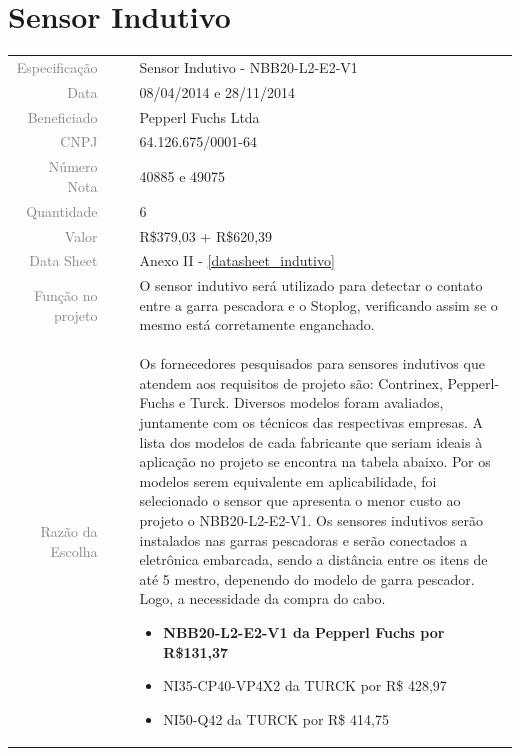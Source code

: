 

\section{Sensor Indutivo}
\label{indutivo}


\begin{table}[ht!]

	\begin{tabular}{r l|l p{12cm} }
		
		\textcolor{gray}{Especificação} &&& 	{Sensor Indutivo - NBB20-L2-E2-V1 }\\
		\textcolor{gray}{Data} &&& 				{08/04/2014 e 28/11/2014}\\
        \textcolor{gray}{Beneficiado} &&&		{Pepperl Fuchs Ltda} \\
        \textcolor{gray}{CNPJ} &&& 				{64.126.675/0001-64} \\
        \textcolor{gray}{Número Nota} &&& 		{40885 e 49075} \\
		\textcolor{gray}{Quantidade} &&& 		{6} \\
		\textcolor{gray}{Valor} &&& 			{R\$379,03 + R\$620,39} \\
		\textcolor{gray}{Data Sheet} &&& 		{Anexo II - \ref{datasheet_indutivo} } \\

		\textcolor{gray}{Função no projeto} &&& {O sensor indutivo será utilizado para detectar o contato entre a garra pescadora e o Stoplog, verificando assim se o mesmo está corretamente enganchado. } \\
		\textcolor{gray}{Razão da Escolha} &&& {Os fornecedores pesquisados para sensores indutivos que atendem aos requisitos de projeto são: Contrinex, Pepperl-Fuchs e Turck. Diversos modelos foram avaliados, juntamente com os técnicos das respectivas empresas. A lista dos modelos de cada fabricante que seriam ideais à aplicação no projeto se encontra na tabela abaixo. Por os modelos serem equivalente em aplicabilidade, foi selecionado o sensor que apresenta o menor custo ao projeto o NBB20-L2-E2-V1. Os sensores indutivos serão instalados nas garras pescadoras e serão conectados a eletrônica embarcada, sendo a distância entre os itens de até 5 mestro, depenendo do modelo de garra pescador. Logo, a necessidade da compra do cabo. 
		\begin{itemize}
		  \item \textbf {NBB20-L2-E2-V1 da Pepperl Fuchs  por R\$131,37}
		  \item NI35-CP40-VP4X2 da TURCK por R\$ 428,97 
		  \item NI50-Q42 da TURCK por R\$ 414,75
		\end{itemize}}
		

	\end{tabular}
\end{table}

